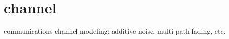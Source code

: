 % 
%

\newpage
\section{channel}
\label{module:channel}
communications channel modeling: additive noise, multi-path fading, etc.

